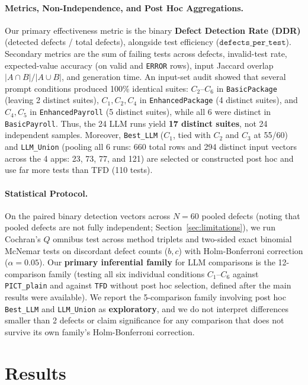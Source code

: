 \documentclass[acmsmall]{acmart}
\begin{document}
\paragraph{Metrics, Non-Independence, and Post Hoc Aggregations.}
Our primary effectiveness metric is the binary \textbf{Defect Detection Rate (DDR)} (detected defects / total defects), alongside test efficiency ($\texttt{defects\_per\_test}$). Secondary metrics are the sum of failing tests across defects, invalid-test rate, expected-value accuracy (on valid and \texttt{ERROR} rows), input Jaccard overlap $|A \cap B| / |A \cup B|$, and generation time. An input-set audit showed that several prompt conditions produced 100\% identical suites: $C_2$--$C_6$ in \texttt{BasicPackage} (leaving 2 distinct suites), $C_1, C_2, C_4$ in \texttt{EnhancedPackage} (4 distinct suites), and $C_4, C_5$ in \texttt{EnhancedPayroll} (5 distinct suites), while all 6 were distinct in \texttt{BasicPayroll}. Thus, the 24 LLM runs yield \textbf{17 distinct suites}, not 24 independent samples. Moreover, \texttt{Best\_LLM} ($C_1$, tied with $C_2$ and $C_3$ at 55/60) and \texttt{LLM\_Union} (pooling all 6 runs: 660 total rows and 294 distinct input vectors across the 4 apps: 23, 73, 77, and 121) are selected or constructed post hoc and use far more tests than TFD (110 tests).

\paragraph{Statistical Protocol.}
On the paired binary detection vectors across $N=60$ pooled defects (noting that pooled defects are not fully independent; Section~\ref{sec:limitations}), we run Cochran's $Q$ omnibus test across method triplets and two-sided exact binomial McNemar tests on discordant defect counts ($b, c$) with Holm-Bonferroni correction ($\alpha=0.05$). Our \textbf{primary inferential family} for LLM comparisons is the 12-comparison family (testing all six individual conditions $C_1$--$C_6$ against \texttt{PICT\_plain} and against \texttt{TFD} without post hoc selection, defined after the main results were available). We report the 5-comparison family involving post hoc \texttt{Best\_LLM} and \texttt{LLM\_Union} as \textbf{exploratory}, and we do not interpret differences smaller than 2 defects or claim significance for any comparison that does not survive its own family's Holm-Bonferroni correction.

\section{Results}
\label{sec:results}
\end{document}
